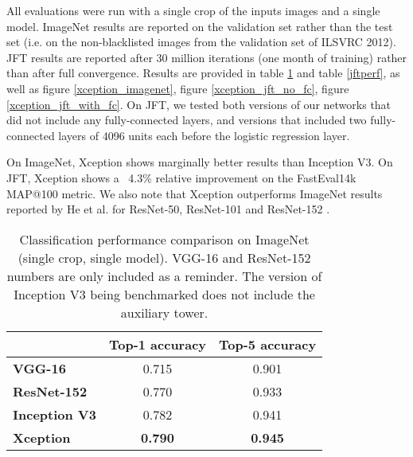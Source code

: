 \documentclass[10pt,twocolumn,letterpaper]{article}
\begin{document}
All evaluations were run with a single crop of the inputs images and a single model. ImageNet results are reported on the validation set rather than the test set (i.e. on the non-blacklisted images from the validation set of ILSVRC 2012). JFT results are reported after 30 million iterations (one month of training) rather than after full convergence. Results are provided in table \ref{imagenetperf} and table \ref{jftperf}, as well as figure \ref{xception_imagenet}, figure \ref{xception_jft_no_fc}, figure \ref{xception_jft_with_fc}. On JFT, we tested both versions of our networks that did not include any fully-connected layers, and versions that included two fully-connected layers of 4096 units each before the logistic regression layer.

On ImageNet, Xception shows marginally better results than Inception V3. On JFT, Xception shows a ~4.3\% relative improvement on the FastEval14k MAP@100 metric. We also note that Xception outperforms ImageNet results reported by He et al. for ResNet-50, ResNet-101 and ResNet-152 \cite{he2015deep}.

\begin{table}[!ht]
\centering
\caption{Classification performance comparison on ImageNet (single crop, single model). VGG-16 and ResNet-152 numbers are only included as a reminder. The version of Inception V3 being benchmarked does not include the auxiliary tower.}
\label{imagenetperf}


  \begin{tabular}{lcc}
  \toprule
              & \textbf{Top-1 accuracy}    & \textbf{Top-5 accuracy} \\ \hline
  \textbf{VGG-16}        &   0.715        &     0.901              \\ \hline
  \textbf{ResNet-152}    &   0.770        &     0.933              \\ \hline
  \textbf{Inception V3}  &   0.782        &     0.941              \\ \hline
  \textbf{Xception}      & \textbf{0.790} & \textbf{0.945}         \\ \hline

  \end{tabular}

\end{table}
\end{document}
